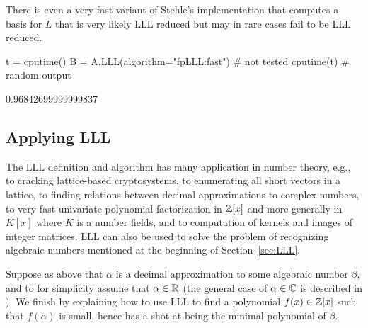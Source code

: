 \noindent{}There is even a very fast variant of Stehle's implementation that computes a basis for $L$ that is very likely LLL reduced but may in rare
cases fail to be LLL reduced.

\begin{sagecode}
\begin{sagecell}
t = cputime()
B = A.LLL(algorithm="fpLLL:fast")   # not tested
cputime(t)      # random output
\end{sagecell}
\begin{sageout}
0.96842699999999837
\end{sageout}
\end{sagecode}

\subsection{Applying LLL}
The LLL definition and algorithm has many application in 
number theory, e.g., to cracking lattice-based cryptosystems,
to enumerating all short vectors in a lattice, to finding relations
between decimal approximations to complex numbers, to very
fast univariate polynomial factorization in $\mathbb{Z}[x]$ and more
generally in $K[x]$ where $K$ is a number fields, and to
computation of kernels and images of integer matrices.  LLL
can also be used to solve the problem of recognizing algebraic
numbers mentioned at the beginning of Section~\ref{sec:LLL}.

Suppose as above that $\alpha$ is a decimal approximation
to some algebraic number $\beta$, and to for simplicity
assume that $\alpha\in\mathbb{R}$ (the general case of $\alpha \in \mathbb{C}$
is described in \cite{cohen:course_ant}). 
We finish by explaining how to use LLL to find a polynomial 
$f(x) \in \mathbb{Z}[x]$ such that $f(\alpha)$ is small, hence
has a shot at being the minimal polynomial of $\beta$. 

